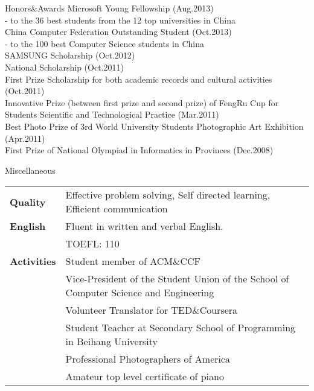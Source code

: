 \documentclass{resume} %
\begin{document}
\begin{rSection}{Honors\&Awards}
Microsoft Young Fellowship (Aug.2013) \\
\hspace*{8pt} - to the 36 best students from the 12 top universities in China \\
China Computer Federation Outstanding Student (Oct.2013) \\
\hspace*{8pt} - to the 100 best Computer Science students in China  \\
SAMSUNG Scholarship (Oct.2012) \\
National Scholarship (Oct.2011) \\
First Prize Scholarship for both academic records and cultural activities (Oct.2011) \\
Innovative Prize (between first prize and second prize) of FengRu Cup for Students Scientific and Technological Practice (Mar.2011) \\
Best Photo Prize of 3rd World University Students Photographic Art Exhibition (Apr.2011) \\
First Prize of National Olympiad in Informatics in Provinces (Dec.2008)
\end{rSection}


\begin{rSection}{Miscellaneous}
\begin{tabular}{ @{} >{\bfseries}l @{\hspace{6ex}} l }
Quality & Effective problem solving, Self directed learning, Efficient communication \\
English & Fluent in written and verbal English. \\
& TOEFL: 110 \\
Activities & Student member of ACM\&CCF \\
& Vice-President of the Student Union of the School of Computer Science and Engineering \\
& Volunteer Translator for TED\&Coursera \\
& Student Teacher at Secondary School of Programming in Beihang University \\
& Professional Photographers of America \\
& Amateur top level certificate of piano
\end{tabular}
\end{rSection}

\end{document}
